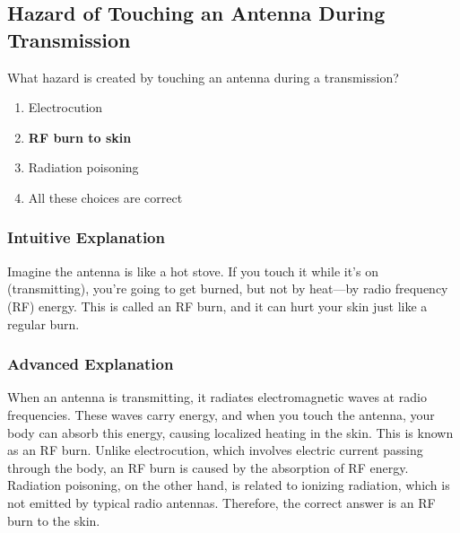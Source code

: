 \subsection{Hazard of Touching an Antenna During Transmission}
\label{T0C07}

\begin{tcolorbox}[colback=gray!10!white,colframe=black!75!black,title=T0C07]
What hazard is created by touching an antenna during a transmission?
\begin{enumerate}[noitemsep]
    \item Electrocution
    \item \textbf{RF burn to skin}
    \item Radiation poisoning
    \item All these choices are correct
\end{enumerate}
\end{tcolorbox}

\subsubsection*{Intuitive Explanation}
Imagine the antenna is like a hot stove. If you touch it while it's on (transmitting), you're going to get burned, but not by heat—by radio frequency (RF) energy. This is called an RF burn, and it can hurt your skin just like a regular burn.

\subsubsection*{Advanced Explanation}
When an antenna is transmitting, it radiates electromagnetic waves at radio frequencies. These waves carry energy, and when you touch the antenna, your body can absorb this energy, causing localized heating in the skin. This is known as an RF burn. Unlike electrocution, which involves electric current passing through the body, an RF burn is caused by the absorption of RF energy. Radiation poisoning, on the other hand, is related to ionizing radiation, which is not emitted by typical radio antennas. Therefore, the correct answer is an RF burn to the skin.